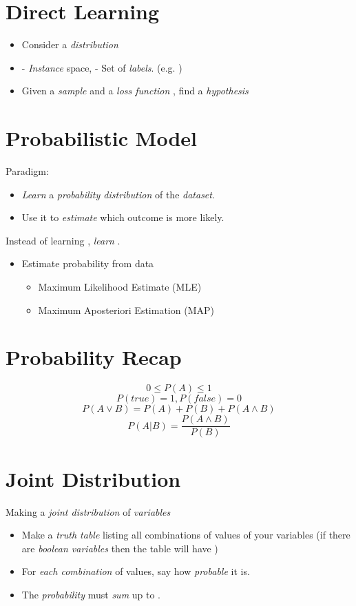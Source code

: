 \documentclass[
	number={3},
	title={Na\:ive Bayes Learning}
]{cs584notes}
\begin{document}
\section{Direct Learning}\label{sec:direct-learning}
\begin{itemize}
	\item Consider a \emph{distribution} 
	\item {} - \emph{Instance} space,  - Set of \emph{labels}. (e.g. )
	\item Given a \emph{sample}  and a \emph{loss function} , find a \emph{hypothesis}
\end{itemize}

\section{Probabilistic Model}\label{sec:probabilistic-model}
Paradigm:
\begin{itemize}
	\item \emph{Learn} a \emph{probability distribution} of the \emph{dataset}.
	\item Use it to \emph{estimate} which outcome is more likely.
\end{itemize}

Instead of learning , \emph{learn} .

\begin{itemize}
	\item Estimate probability from data
	\begin{itemize}
		\item Maximum Likelihood Estimate (MLE)
		\item Maximum Aposteriori Estimation (MAP)
	\end{itemize}
\end{itemize}

\section{Probability Recap}\label{sec:probability-recap}
\[ 0 \leq P(A) \leq 1 \]
\[ P(true) = 1, P(false) = 0 \]
\[ P(A \lor B) = P(A) + P(B) + P(A \land B) \]
\[ P(A|B) = \frac{P(A\land B)}{{P(B)}} \]

\section{Joint Distribution}\label{sec:joint-distribution}
Making a \emph{joint distribution} of  \emph{variables}
\begin{itemize}
	\item Make a \emph{truth table} listing all combinations of values of your variables (if there are  \emph{boolean variables} then the table will have )
	\item For \emph{each combination} of values, say how \emph{probable} it is.
	\item The \emph{probability} must \emph{sum} up to .
\end{itemize}
\end{document}
